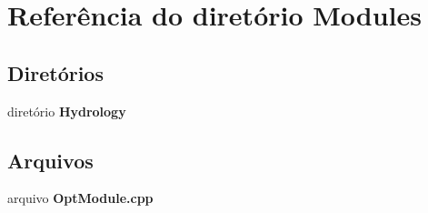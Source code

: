 \section{Referência do diretório Modules}
\label{dir_e7b1ac1e90103dab7306ed40bc95efc2}
\subsection*{Diretórios}
\begin{DoxyCompactItemize}
\item 
diretório {\bf Hydrology}
\end{DoxyCompactItemize}
\subsection*{Arquivos}
\begin{DoxyCompactItemize}
\item 
arquivo {\bf Opt\+Module.\+cpp}
\end{DoxyCompactItemize}
